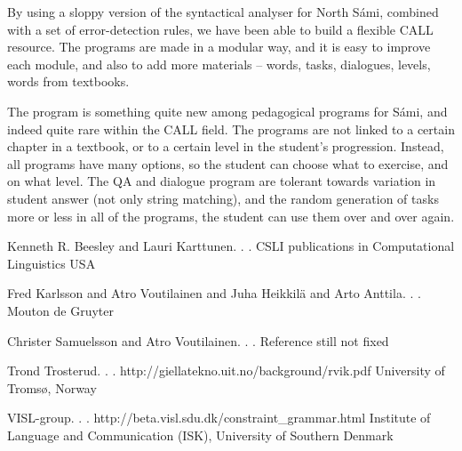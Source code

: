 \documentclass[11pt]{article}
\begin{document}
By using a sloppy version of the syntactical analyser for North Sámi, combined with a set of error-detection rules, we have been able to build a flexible CALL resource. The programs are made in a  modular way, and it is easy to improve each module, and also to add more materials -- words, tasks, dialogues, levels, words from textbooks. 

The program is something quite new among pedagogical programs for Sámi, and indeed quite rare within the CALL field. The programs are not linked to a certain chapter in a textbook, or to a certain level in the student's progression. Instead, all programs have many options, so the student can choose what to exercise, and on what level. The QA and dialogue program are tolerant towards variation in student answer (not only string matching), and the random generation of tasks more or less in all of the programs, the student can use them over and over again. 



\begin{thebibliography}{}

{Kenneth R. Beesley and Lauri Karttunen}.
.
.
\newblock CSLI publications in Computational Linguistics
\newblock USA


{Fred Karlsson and Atro Voutilainen and Juha Heikkilä and Arto Anttila}.
.
.
\newblock Mouton de Gruyter


{Christer Samuelsson and Atro Voutilainen}.
.
.
\newblock Reference still not fixed




{Trond Trosterud}.
.
.
\newblock http://giellatekno.uit.no/background/rvik.pdf
\newblock University of Tromsø, Norway

{VISL-group}.
.
.
\newblock http://beta.visl.sdu.dk/constraint\_grammar.html
\newblock Institute of Language and Communication (ISK), University of Southern Denmark


\end{thebibliography}


%
%



	
\end{document}
